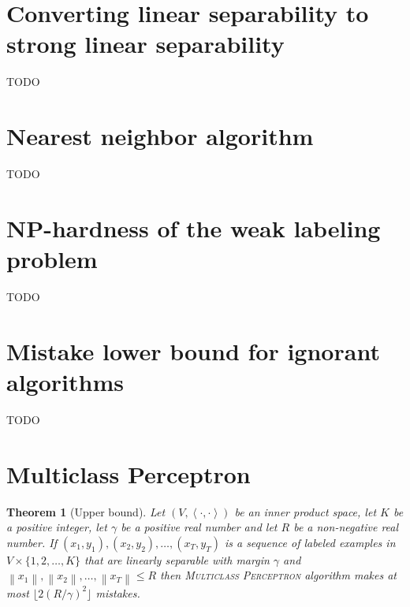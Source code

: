 \documentclass[12pt]{article}
\newtheorem{theorem}[definition]{Theorem}
\newcommand{\ip}[2]{\left\langle #1, #2 \right\rangle} %
\newcommand{\norm}[1]{\left\| #1 \right\|}  %
\begin{document}
\section{Converting linear separability to strong linear separability}

TODO


\section{Nearest neighbor algorithm}

TODO


\section{NP-hardness of the weak labeling problem}

TODO


\section{Mistake lower bound for ignorant algorithms}

TODO




\appendix

\section{Multiclass Perceptron}
\label{section:multiclass-perceptron-proofs}

\begin{theorem}[Upper bound]
Let $(V, \ip{\cdot}{\cdot})$ be an inner product space, let $K$ be a positive
integer, let $\gamma$ be a positive real number and let $R$ be a non-negative real
number. If $(x_1, y_1), (x_2, y_2), \dots, (x_T, y_T)$ is a sequence of labeled
examples in $V \times \{1,2,\dots,K\}$ that are linearly separable with margin
$\gamma$ and $\norm{x_1}, \norm{x_2}, \dots, \norm{x_T} \le R$
then \textsc{Multiclass Perceptron} algorithm makes at most $\lfloor
2(R/\gamma)^2 \rfloor$ mistakes.
\end{theorem}
\end{document}
